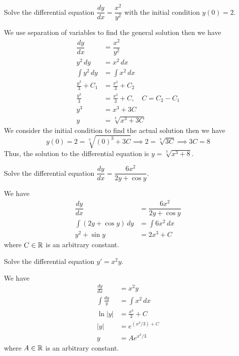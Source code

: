 \begin{problem}
    Solve the differential equation \(\dfrac{dy}{dx}=\dfrac{x^2}{y^2}\) with
    the initial condition \(y(0)=2\).
\end{problem}
\begin{solution}
    We use separation of variables to find the general solution then we have
    \begin{align*}
        \dfrac{dy}{dx} &= \dfrac{x^2}{y^2} \\ y^2\,dy&= x^2\,dx \\
        \int y^2\,dy &= \int x^2\,dx \\
        \frac{y^3}{3}+C_1 &= \frac{x^3}{3}+C_2 \\
        \frac{y^3}{3} &=\frac{x^3}{3}+C,\quad C=C_2-C_1 \\
        y^3 &= x^3+3C \\ y &= \sqrt[3]{x^3+3C}
    \end{align*}
    We consider the initial condition to find the actual solution then we have
    \[y(0)=2=\sqrt[3]{(0)^3+3C} \implies 2=\sqrt[3]{3C} \implies 3C=8\]
    Thus, the solution to the differential equation is \(y=\sqrt[3]{x^3+8}\).
\end{solution}
\begin{problem}
    Solve the differential equation \(\dfrac{dy}{dx}=\dfrac{6x^2}{2y+\cos y}\).
\end{problem}
\begin{solution}
    We have
    \begin{align*}
        \dfrac{dy}{dx} &= \dfrac{6x^2}{2y+\cos y} \\
        \int(2y+\cos y)\,dy &= \int 6x^2\,dx \\
        y^2+\sin y &= 2x^3+C
    \end{align*}
    where \(C\in\mathbb{R}\) is an arbitrary constant.
\end{solution}
\begin{problem}
    Solve the differential equation \(y'=x^2y\).
\end{problem}
\begin{solution}
    We have
    \begin{align*}
        \frac{dy}{dx} &= x^2y \\ \int \frac{dy}{y} &= \int x^2\,dx \\
        \ln |y| &= \frac{x^3}{3}+C \\ |y| &= e^{(x^3/3)+C}\\ y &= Ae^{x^3/3}
    \end{align*}
    where \(A\in\mathbb{R}\) is an arbitrary constant.
\end{solution}
